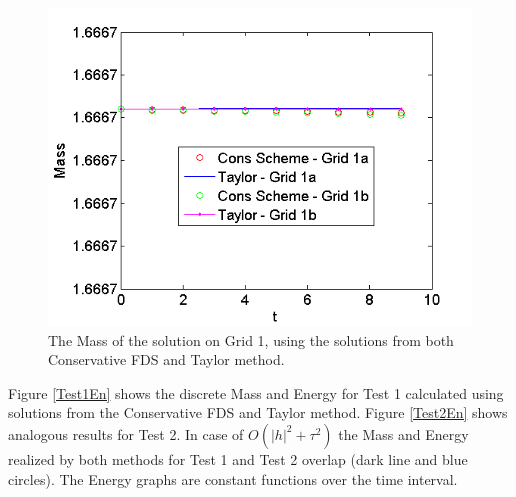 \documentclass[%
 aip,
cp,  
 amsmath,amssymb,
 reprint,
]{iopconfser}
\begin{document}
\begin{figure}[ht]\vspace{0.2cm}
	\begin{minipage}[b]{0.4\linewidth}
		 \includegraphics[width=\linewidth]{mass.png}
	\end{minipage}	
\caption{The Mass of the solution on Grid 1, using the solutions from both Conservative FDS and Taylor method.}
\label{massFig}
\end{figure}
\iffalse
Figure \ref{Test1En} shows the discrete Mass and Energy for Test 1 calculated using solutions from the Conservative FDS and Taylor method. Figure \ref{Test2En} shows analogous results for Test 2. In case of $O(|h|^2 +\tau^2)$ the Mass and Energy realized by both methods for Test 1 and Test 2 overlap (dark line and blue circles). The Energy graphs are constant functions over the time interval.
\end{document}
